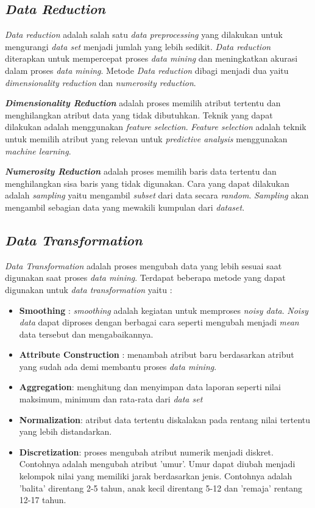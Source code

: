 \subsection{\textit{Data Reduction}} 
\textit{Data reduction} adalah salah satu \textit{data preprocessing} yang dilakukan untuk mengurangi \textit{data set} menjadi jumlah yang lebih sedikit. \textit{Data reduction} diterapkan untuk mempercepat proses \textit{data mining} dan meningkatkan akurasi dalam proses \textit{data mining}. Metode \textit{Data reduction} dibagi menjadi dua yaitu \textit{dimensionality reduction} dan \textit{numerosity reduction}. 

\textbf{\textit{Dimensionality Reduction}} adalah proses memilih atribut tertentu dan menghilangkan atribut data yang tidak dibutuhkan. Teknik yang dapat dilakukan adalah menggunakan \textit{feature selection}. \textit{Feature selection} adalah teknik untuk memilih atribut yang relevan untuk \textit{predictive analysis} menggunakan \textit{machine learning}.

\textbf{\textit{Numerosity Reduction}} adalah proses memilih baris data tertentu dan menghilangkan sisa baris yang tidak digunakan. Cara yang dapat dilakukan adalah \textit{sampling} yaitu mengambil \textit{subset} dari data secara \textit{random}. \textit{Sampling} akan mengambil sebagian data yang mewakili kumpulan dari \textit{dataset}. 

\subsection{\textit{Data Transformation}}
\textit{Data Transformation} adalah proses mengubah data yang lebih sesuai saat digunakan saat proses \textit{data mining}. Terdapat beberapa metode yang dapat digunakan untuk \textit{data transformation} yaitu : 

\begin{itemize}
\item \textbf{Smoothing} : \textit{smoothing} adalah kegiatan untuk memproses \textit{noisy data}. \textit{Noisy data} dapat diproses dengan berbagai cara seperti mengubah menjadi \textit{mean} data tersebut dan mengabaikannya.
\item \textbf{Attribute Construction} : menambah atribut baru berdasarkan atribut yang sudah ada demi membantu proses \textit{data mining}. 
\item \textbf{Aggregation}: menghitung dan menyimpan data laporan seperti nilai maksimum, minimum dan rata-rata dari \textit{data set}
\item \textbf{Normalization}: atribut data tertentu diskalakan pada rentang nilai tertentu yang lebih distandarkan.
\item \textbf{Discretization}: proses mengubah atribut numerik menjadi diskret. Contohnya adalah mengubah  atribut 'umur'. Umur dapat diubah menjadi kelompok nilai yang memiliki jarak  berdasarkan jenis. Contohnya adalah 'balita' direntang 2-5 tahun, anak kecil direntang 5-12 dan 'remaja' rentang 12-17 tahun. 
\end{itemize}


